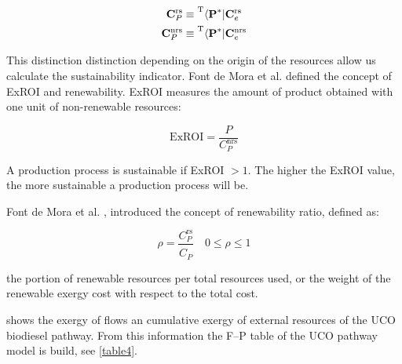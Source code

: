 \documentclass[sustainability,article,submit,moreauthors,pdftex,12pt,a4paper]{mdpi}
\newcommand{\tmopcr}[1]{\ensuremath{\prescript{\mathrm{T}}{}{\left\langle {\textbf{#1}^\ast } \right|}}}
\newcommand{\vms}[3][\phantom{\ast}]{\ensuremath{\mathbf{#2}_{#3}^\mathrm{#1}}}
\newcommand{\ems}[3][\phantom{\ast}]{\ensuremath{{#2}_{#3}^\mathrm{#1}}}
\begin{document}
\begin{equation}
\label{cpnrs}
\begin{split}
 \vms[rs]{C}{P} &\equiv \tmopcr{P} \vms[rs]{C}{e} \\
 \vms[nrs]{C}{P} &\equiv \tmopcr{P} \vms[nrs]{C}{e}
\end{split}
\end{equation}

This distinction distinction depending on the origin of the resources allow us calculate the sustainability indicator. Font de Mora et al. \cite{FontdeMora2012} defined the concept of ExROI and renewability. ExROI measures the amount of product obtained with one unit of non-renewable resources: 

\begin{equation}
\label{exroi}
\textrm{ExROI}=\frac{P}{\ems[nrs]{C}{P}}
\end{equation}

A production process is sustainable if ExROI $>1$. The higher the ExROI value, the more sustainable a production process will be.

Font de Mora et al. \cite{FontdeMora2013}, introduced the concept of renewability ratio, defined as:

\begin{equation}
\label{rho}
\rho=\frac{\ems[rs]{C}{P}}{\ems{C}{P}} \quad 0 \leq \rho \leq 1
\end{equation}

the portion of renewable resources per total resources used, or the weight of the renewable exergy cost with respect to the total cost.

 shows the exergy of flows an cumulative exergy of external resources of the UCO biodiesel pathway. From this information the F--P table of the UCO pathway model is build, see \cref{table4}.
\end{document}

